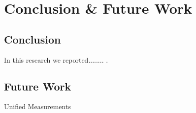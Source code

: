 \documentclass[12pt,a4paper,oneside]{book}
\begin{document}
	






\chapter{Conclusion \& Future Work}\label{ch:Conclusions}


	\section{Conclusion}\label{sec:conclusion}

	In this research we reported........ .

	\section{Future Work}\label{sec:future}
	Unified Measurements


\end{document}
